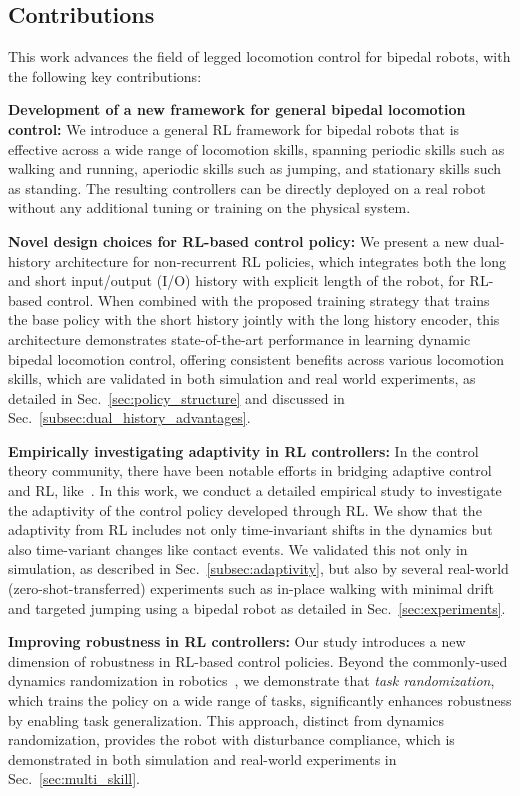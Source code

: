 \subsection{Contributions}
This work advances the field of legged locomotion control for bipedal robots, with the following key contributions:

\textbf{Development of a new framework for general bipedal locomotion control:} 
We introduce a general RL framework for bipedal robots that is effective across a wide range of locomotion skills, spanning periodic skills such as walking and running, aperiodic skills such as jumping, and stationary skills such as standing. The resulting controllers can be directly deployed on a real robot without any additional tuning or training on the physical system. 


\textbf{Novel design choices for RL-based control policy:} We present a new dual-history architecture for non-recurrent RL policies, which integrates both the long and short input/output (I/O) history with explicit length of the robot, for RL-based control. When combined with the proposed training strategy that trains the base policy with the short history jointly with the long history encoder, this architecture demonstrates state-of-the-art performance in learning dynamic bipedal locomotion control, offering consistent benefits across various locomotion skills, which are validated in both simulation and real world experiments, as detailed in Sec.~\ref{sec:policy_structure} and discussed in Sec.~\ref{subsec:dual_history_advantages}. 


\textbf{Empirically investigating adaptivity in RL controllers:} In the control theory community, there have been notable efforts in bridging adaptive control and RL, like~\cite{annaswamy2023adaptive}. In this work, we conduct a detailed empirical study to investigate the adaptivity of the control policy developed through RL. We show that the adaptivity from RL includes not only time-invariant shifts in the dynamics but also time-variant changes like contact events. We validated this not only in simulation, as described in Sec.~\ref{subsec:adaptivity}, but also by several real-world (zero-shot-transferred) experiments such as in-place walking with minimal drift and targeted jumping using a bipedal robot as detailed in Sec.~\ref{sec:experiments}.



\textbf{Improving robustness in RL controllers:} Our study introduces a new dimension of robustness in RL-based control policies. Beyond the commonly-used dynamics randomization in robotics~\citep{peng2018sim}, we demonstrate that \emph{task randomization}, which trains the policy on a wide range of tasks, significantly enhances robustness by enabling task generalization. This approach, distinct from dynamics randomization, provides the robot with disturbance compliance, which is demonstrated in both simulation and real-world experiments in Sec.~\ref{sec:multi_skill}.


